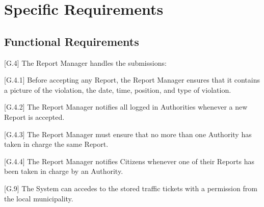 \documentclass{report}
\begin{document}
\chapter{Specific Requirements}
\section{Functional Requirements}
\begin{itemize}
	\item {[G.4]} The Report Manager handles the submissions:
    {\setlength\itemindent{25pt} \item {[G.4.1]} Before accepting any Report, the Report Manager ensures that it contains a picture of the violation, the date, time, position, and type of violation.}
    {\setlength\itemindent{25pt} \item {[G.4.2]} The Report Manager notifies all logged in Authorities whenever a new Report is accepted.}
    {\setlength\itemindent{25pt} \item {[G.4.3]} The Report Manager must ensure that no more than one Authority has taken in charge the same Report.}
    {\setlength\itemindent{25pt} \item {[G.4.4]} The Report Manager notifies Citizens whenever one of their Reports has been taken in charge by an Authority.}
	\item {[G.9]} The System can accedes to the stored traffic tickets with a permission from the local municipality.
\end{itemize}
\end{document}
